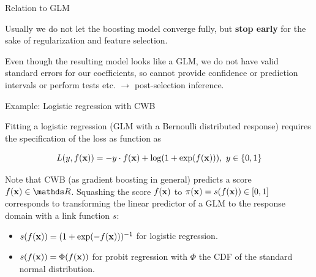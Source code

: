 \documentclass[11pt,compress,t,notes=noshow, xcolor=table]{beamer}
\begin{document}
\begin{vbframe}{Relation to GLM}
\lz

Usually we do not let the boosting model converge fully, but \textbf{stop
early} for the sake of regularization and feature selection.

\lz

Even though the resulting model looks like a GLM, we do not have valid standard
errors for our coefficients,
so cannot provide confidence or prediction intervals or perform tests etc.
$\rightarrow$ post-selection inference.

\end{vbframe}


\begin{vbframe}{Example: Logistic regression with CWB}

Fitting a logistic regression (GLM with a Bernoulli distributed response) requires the specification of the loss as function as

$$
  L(y, f(\mathbf{x})) = -y \cdot f(\mathbf{x}) + \log (1 + \exp(f(\mathbf{x}))),\ y\in\{0, 1\}
$$

Note that CWB (as gradient boosting in general) predicts a score $\fx \in \R$. Squashing the score $f(\mathbf{x})$ to $\pi(\mathbf{x}) = s(f(\mathbf{x})) \in [0,1]$ corresponds to transforming the linear predictor of a GLM to the response domain with a link function $s$:

\begin{itemize}
  \item $s(f(\mathbf{x})) = (1 + \exp(-f(\mathbf{x})))^{-1}$ for logistic regression.
  \item $s(f(\mathbf{x})) = \Phi(f(\mathbf{x}))$ for probit regression with $\Phi$ the CDF of the standard normal distribution.
\end{itemize}

\end{vbframe}


\end{document}
